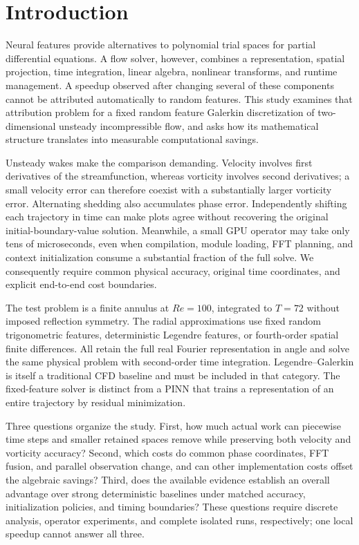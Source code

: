 \section{Introduction}
\label{sec:introduction}

Neural features provide alternatives to polynomial trial spaces for partial differential equations. A flow solver, however, combines a representation, spatial projection, time integration, linear algebra, nonlinear transforms, and runtime management. A speedup observed after changing several of these components cannot be attributed automatically to random features. This study examines that attribution problem for a fixed random feature Galerkin discretization of two-dimensional unsteady incompressible flow, and asks how its mathematical structure translates into measurable computational savings.

Unsteady wakes make the comparison demanding. Velocity involves first derivatives of the streamfunction, whereas vorticity involves second derivatives; a small velocity error can therefore coexist with a substantially larger vorticity error. Alternating shedding also accumulates phase error. Independently shifting each trajectory in time can make plots agree without recovering the original initial-boundary-value solution. Meanwhile, a small GPU operator may take only tens of microseconds, even when compilation, module loading, FFT planning, and context initialization consume a substantial fraction of the full solve. We consequently require common physical accuracy, original time coordinates, and explicit end-to-end cost boundaries.

The test problem is a finite annulus at $Re=100$, integrated to $T=72$ without imposed reflection symmetry. The radial approximations use fixed random trigonometric features, deterministic Legendre features, or fourth-order spatial finite differences. All retain the full real Fourier representation in angle and solve the same physical problem with second-order time integration. Legendre--Galerkin is itself a traditional CFD baseline and must be included in that category. The fixed-feature solver is distinct from a PINN that trains a representation of an entire trajectory by residual minimization.

Three questions organize the study. First, how much actual work can piecewise time steps and smaller retained spaces remove while preserving both velocity and vorticity accuracy? Second, which costs do common phase coordinates, FFT fusion, and parallel observation change, and can other implementation costs offset the algebraic savings? Third, does the available evidence establish an overall advantage over strong deterministic baselines under matched accuracy, initialization policies, and timing boundaries? These questions require discrete analysis, operator experiments, and complete isolated runs, respectively; one local speedup cannot answer all three.

